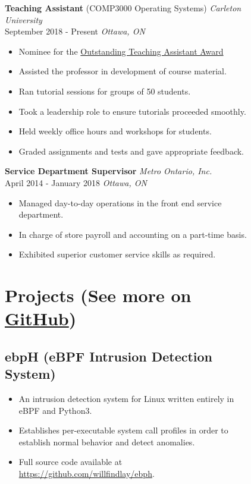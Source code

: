 \documentclass[
]{article}
\theoremstyle{plain}
\theoremstyle{remark}
\theoremstyle{definition}
\begin{document}
\begin{figure}
\begin{minipage}[t]{0.65\textwidth}
\color{black}
\textbf{Teaching Assistant} (COMP3000 Operating Systems) \hfill \emph{Carleton University}\\
September 2018 - Present \hfill\emph {Ottawa, ON}
\color{gray}
\begin{itemize}[itemsep=0em]
\item Nominee for the \href{https://carleton.ca/tasupport/taawards/edc-outstanding-ta-awards/}{Outstanding Teaching Assistant Award}
\item Assisted the professor in development of course material.
\item Ran tutorial sessions for groups of 50 students.
\item Took a leadership role to ensure tutorials proceeded smoothly.
\item Held weekly office hours and workshops for students.
\item Graded assignments and tests and gave appropriate feedback.
\end{itemize}

\color{black}
\textbf{Service Department Supervisor} \hfill \emph{Metro Ontario, Inc.}\\
April 2014 - January 2018 \hfill\emph {Ottawa, ON}
\color{gray}
\begin{itemize}[itemsep=0em]
\item Managed day-to-day operations in the front end service department.
\item In charge of store payroll and accounting on a part-time basis.
\item Exhibited superior customer service skills as required.
\end{itemize}

\section{Projects \normalfont \small (See more on \href{https://www.github.com/willfindlay}{GitHub})}

\subsection{ebpH (eBPF Intrusion Detection System)}
\begin{itemize}[itemsep=0em]
\item An intrusion detection system for Linux written entirely in eBPF and Python3.
\item Establishes per-executable system call profiles in order to establish normal behavior and detect anomalies.
\item Full source code available at \url{https://github.com/willfindlay/ebph}.
\end{itemize}


\end{minipage}
\end{figure}
\end{document}
